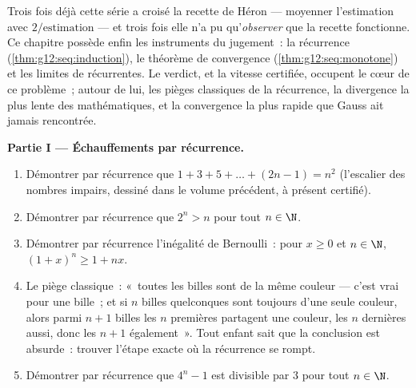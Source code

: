 \begin{problem}
\label{pb:g12:seq:1}
Trois fois déjà cette série a croisé la recette de Héron ---
moyenner l'estimation avec $2/\text{estimation}$ --- et trois fois
elle n'a pu qu'\emph{observer} que la recette fonctionne. Ce
chapitre possède enfin les instruments du jugement~: la récurrence
(\cref{thm:g12:seq:induction}), le théorème de convergence 
(\cref{thm:g12:seq:monotone}) et les limites de  récurrentes.
Le verdict, et la vitesse certifiée, occupent le cœur de ce
problème~; autour de lui, les pièges classiques de la récurrence, la
divergence la plus lente des mathématiques, et la convergence la
plus rapide que Gauss ait jamais rencontrée.

\medskip
\noindent\textbf{Partie I --- Échauffements par récurrence.}
\begin{enumerate}
  \item Démontrer par récurrence que
        $1 + 3 + 5 + \dots + (2n - 1) = n^2$ (l'escalier des
        nombres impairs, dessiné dans le volume précédent, à présent
        certifié).
  \item Démontrer par récurrence que $2^n > n$ pour tout
        $n \in \N$.
  \item Démontrer par récurrence l'inégalité de Bernoulli~: pour
        $x \geq 0$ et $n \in \N$, $(1 + x)^n \geq 1 + nx$.
  \item Le piège classique~: «~toutes les billes sont de la même
        couleur --- c'est vrai pour une bille~; et si $n$ billes
        quelconques sont toujours d'une seule couleur, alors parmi
        $n + 1$ billes les $n$ premières partagent une couleur, les
        $n$ dernières aussi, donc les $n + 1$ également~». Tout
        enfant sait que la conclusion est absurde~: trouver l'étape
        exacte où la récurrence se rompt.
  \item Démontrer par récurrence que $4^n - 1$ est divisible par
        $3$ pour tout $n \in \N$.
\end{enumerate}


\end{problem}
